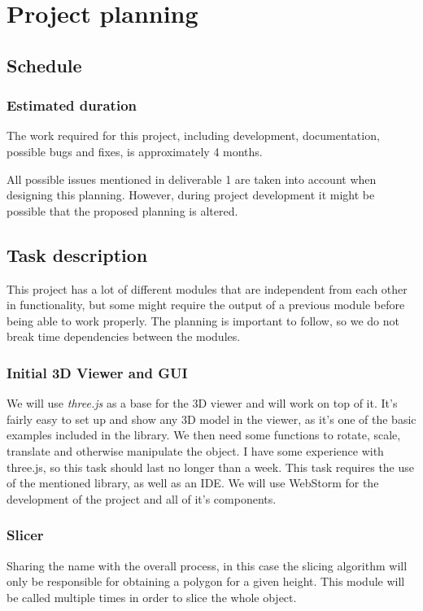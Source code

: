 \section{Project planning}
\subsection{Schedule}

\subsubsection{Estimated duration}
The work required for this project, including development, documentation, possible bugs and fixes, is approximately 4 months.

All possible issues mentioned in deliverable 1 are taken into account when designing this planning. However, during project development it might be possible that the proposed planning is altered.

\subsection{Task description}

This project has a lot of different modules that are independent from each other in functionality, but some might require the output of a previous module before being able to work properly. The planning is important to follow, so we do not break time dependencies between the modules.

\subsubsection{Initial 3D Viewer and GUI}
We will use \emph{three.js} as a base for the 3D viewer and will work on top of it. It's fairly easy to set up and show any 3D model in the viewer, as it's one of the basic examples included in the library. We then need some functions to rotate, scale, translate and otherwise manipulate the object. I have some experience with three.js, so this task should last no longer than a week. This task requires the use of the mentioned library, as well as an IDE. We will use WebStorm \cite{webstorm} for the development of the project and all of it's components.

\subsubsection{Slicer}
Sharing the name with the overall process, in this case the slicing algorithm will only be responsible for obtaining a polygon for a given height. This module will be called multiple times in order to slice the whole object.

